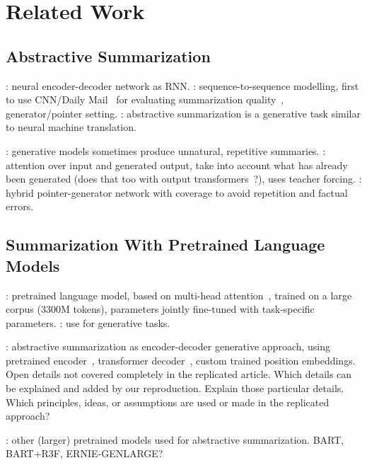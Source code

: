 \section{Related Work} %


\subsection{Abstractive Summarization}


\citeauthor{Sutskever2014?,Chopra2016?,NallapatiZSGX2016}: neural encoder-decoder network as RNN.
\citeauthor{NallapatiZSGX2016}: sequence-to-sequence modelling, first to use CNN/Daily Mail~\cite{HermannKGEKSB2015} for evaluating summarization quality~\cite{T5}, generator/pointer setting.
\citeauthor{???}: abstractive summarization is a generative task similar to neural machine translation.

\citeauthor{Paulus2018,SeeLM2017}: generative models sometimes produce unnatural, repetitive summaries.
\citeauthor{Paulus2018}: attention over input and generated output, take into account what has already been generated (\Bert does that too with output transformers~\cite{DevlinCLT2019}?), uses teacher forcing.
\citeauthor{SeeLM2017}: hybrid pointer-generator network with coverage to avoid repetition and factual errors.

\subsection{Summarization With Pretrained Language Models}

\citeauthor{DevlinCLT2019}: pretrained language model, based on multi-head attention~\cite{VaswaniSPUJGKP2017}, trained on a large corpus (3300M tokens), \Bert parameters jointly fine-tuned with task-specific parameters.
\citeauthor{Edunov2019?,Rothe2019?}: use \Bert for generative tasks.

\citeauthor{LiuL2019}: abstractive summarization as encoder-decoder generative approach, using pretrained \Bert encoder~\cite{DevlinCLT2019}, transformer decoder~\cite{VaswaniSPUJGKP2017}, custom trained position embeddings.
Open details not covered completely in the replicated article.
Which details can be explained and added by our reproduction.
Explain those particular details.
Which principles, ideas, or assumptions are used or made in the replicated approach?

\citeauthor{???}: other (larger) pretrained models used for abstractive summarization.
BART, BART+R3F, ERNIE-GENLARGE?

